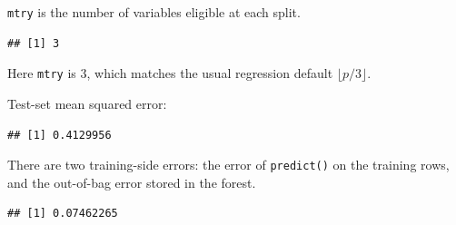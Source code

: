 \documentclass[
]{book}
\newenvironment{Shaded}{\begin{snugshade}}{\end{snugshade}}
\newcommand{\DecValTok}[1]{\textcolor[rgb]{0.00,0.00,0.81}{#1}}
\newcommand{\FunctionTok}[1]{\textcolor[rgb]{0.13,0.29,0.53}{\textbf{#1}}}
\newcommand{\NormalTok}[1]{#1}
\newcommand{\OtherTok}[1]{\textcolor[rgb]{0.56,0.35,0.01}{#1}}
\newcommand{\SpecialCharTok}[1]{\textcolor[rgb]{0.81,0.36,0.00}{\textbf{#1}}}
\begin{document}
\texttt{mtry} is the number of variables eligible at each split.

\begin{Shaded}
\end{Shaded}

\begin{verbatim}
## [1] 3
\end{verbatim}

Here \texttt{mtry} is 3, which matches the usual regression default \(\lfloor p/3 \rfloor\).

Test-set mean squared error:

\begin{Shaded}
\end{Shaded}

\begin{verbatim}
## [1] 0.4129956
\end{verbatim}

There are two training-side errors: the error of \texttt{predict()} on the training rows, and the out-of-bag error stored in the forest.

\begin{Shaded}
\end{Shaded}

\begin{verbatim}
## [1] 0.07462265
\end{verbatim}
\end{document}
